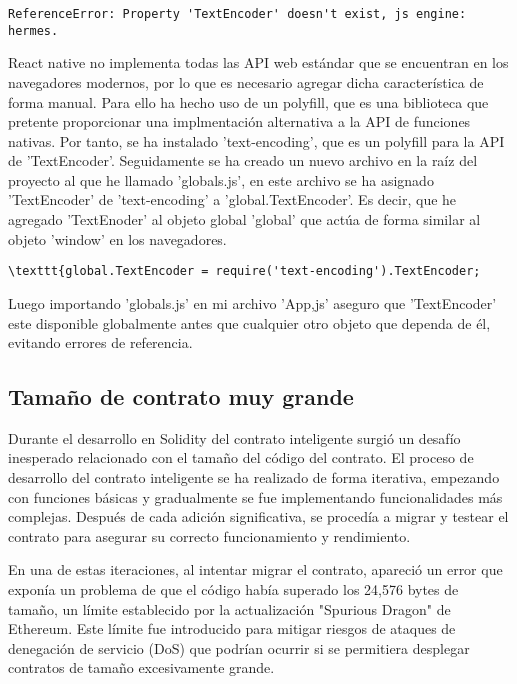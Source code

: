 \begin{verbatim}
ReferenceError: Property 'TextEncoder' doesn't exist, js engine: hermes.
\end{verbatim}

React native no implementa todas las API web estándar que se encuentran en los navegadores modernos, por lo que es necesario agregar dicha característica de forma manual. Para ello ha hecho uso de un polyfill, que es una biblioteca que pretente proporcionar una implmentación alternativa a la API de funciones nativas.
Por tanto, se ha instalado 'text-encoding', que es un polyfill para la API de 'TextEncoder'.
Seguidamente se ha creado un nuevo archivo en la raíz del proyecto al que he llamado 'globals.js', en este archivo se ha asignado 'TextEncoder' de 'text-encoding' a 'global.TextEncoder'. Es decir, que he agregado 'TextEnoder' al objeto global 'global' que actúa de forma similar al objeto 'window' en los navegadores.

\begin{verbatim}
\texttt{global.TextEncoder = require('text-encoding').TextEncoder;
\end{verbatim}

Luego importando 'globals.js' en mi archivo 'App,js' aseguro que 'TextEncoder' este disponible globalmente antes que cualquier otro objeto que dependa de él, evitando errores de referencia.


\subsection{Tamaño de contrato muy grande}

Durante el desarrollo en Solidity del contrato inteligente surgió un desafío inesperado relacionado con el tamaño del código del contrato.
El proceso de desarrollo del contrato inteligente se ha realizado de forma iterativa, empezando con funciones básicas y gradualmente se fue implementando funcionalidades más complejas. Después de cada adición significativa, se procedía a migrar y testear el contrato para asegurar su correcto funcionamiento y rendimiento.

En una de estas iteraciones, al intentar migrar el contrato, apareció un error que exponía un problema de que el código había superado los 24,576 bytes de tamaño, un límite establecido por la actualización "Spurious Dragon" de Ethereum. Este límite fue introducido para mitigar riesgos de ataques de denegación de servicio (DoS) que podrían ocurrir si se permitiera desplegar contratos de tamaño excesivamente grande.

